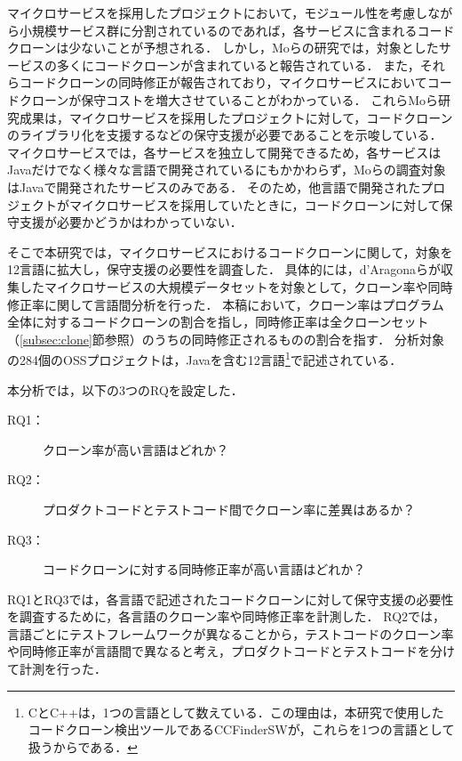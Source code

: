 \documentclass[T,J]{fose}
\begin{document}
マイクロサービスを採用したプロジェクトにおいて，モジュール性を考慮しながら小規模サービス群に分割されているのであれば，各サービスに含まれるコードクローンは少ないことが予想される．
しかし，Moらの研究では，対象としたサービスの多くにコードクローンが含まれていると報告されている\cite{mo2021existence}．
また，それらコードクローンの同時修正が報告されており，マイクロサービスにおいてコードクローンが保守コストを増大させていることがわかっている\cite{mo2021existence}．
これらMoら研究成果は，マイクロサービスを採用したプロジェクトに対して，コードクローンのライブラリ化を支援するなどの保守支援が必要であることを示唆している．
マイクロサービスでは，各サービスを独立して開発できるため，各サービスはJavaだけでなく様々な言語で開発されているにもかかわらず，Moらの調査対象はJavaで開発されたサービスのみである．
そのため，他言語で開発されたプロジェクトがマイクロサービスを採用していたときに，コードクローンに対して保守支援が必要かどうかはわかっていない．

そこで本研究では，マイクロサービスにおけるコードクローンに関して，対象を12言語に拡大し，保守支援の必要性を調査した．
具体的には，d'Aragonaらが収集したマイクロサービスの大規模データセット\cite{amoroso2024dataset}を対象として，クローン率や同時修正率に関して言語間分析を行った．
本稿において，クローン率はプログラム全体に対するコードクローンの割合を指し，同時修正率は全クローンセット（\ref{subsec:clone}節参照）のうちの同時修正されるものの割合を指す．
分析対象の284個のOSSプロジェクトは，Javaを含む12言語\footnote{CとC++は，1つの言語として数えている．この理由は，本研究で使用したコードクローン検出ツールであるCCFinderSWが，これらを1つの言語として扱うからである．}で記述されている．

本分析では，以下の3つのRQを設定した．
\begin{description}
    \item[RQ1：] クローン率が高い言語はどれか？
    \item[RQ2：] プロダクトコードとテストコード間でクローン率に差異はあるか？
    \item[RQ3：] コードクローンに対する同時修正率が高い言語はどれか？
\end{description}
RQ1とRQ3では，各言語で記述されたコードクローンに対して保守支援の必要性を調査するために，各言語のクローン率や同時修正率を計測した．
RQ2では，言語ごとにテストフレームワークが異なることから，テストコードのクローン率や同時修正率が言語間で異なると考え，プロダクトコードとテストコードを分けて計測を行った．
\end{document}
